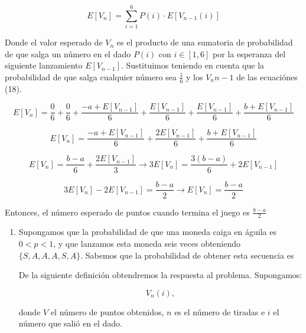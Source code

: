 \documentclass[12pt]{exam}
\begin{document}
\begin{enumerate}
\begin{enumerate}[label=c.]
\begin{equation}
    E[V_n] = \sum_{i=1}^6 P(i)\cdot E[V_{n-1}(i)]
\end{equation}

\justify
Donde el valor esperado de $V_n$ es el producto de una sumatoria de probabilidad de que salga un n\'umero en el dado $P(i)$ con $i\in[1,6]$ por la esperanza del siguiente lanzamiento $E[V_{n-1}]$. Sustituimos teniendo en cuenta que la probabilidad de que salga cualquier n\'umero sea $\frac{1}{6}$ y los $V_n{n-1}$ de las ecuaci\'ones (18).

\begin{equation}
    E[V_n] = \frac{0}{6} + \frac{0}{6} + \frac{- a + E[V_{n-1}]}{6} + \frac{E[V_{n-1}]}{6} + \frac{E[V_{n-1}]}{6} + \frac{b + E[V_{n-1}]}{6}
\end{equation}

\begin{equation}
     E[V_n] = \frac{- a + E[V_{n-1}]}{6} + \frac{2E[V_{n-1}]}{6} + \frac{b + E[V_{n-1}]}{6}
\end{equation}

\begin{equation}
     E[V_n] = \frac{b - a}{6} + \frac{2E[V_{n-1}]}{3} \rightarrow 3E[V_n] = \frac{3(b - a)}{6} + 2E[V_{n-1}]
\end{equation}

\begin{equation}
     3E[V_n] - 2E[V_{n-1}] = \frac{b - a}{2} \rightarrow E[V_n] = \frac{b-a}{2}
\end{equation}

\justify
Entonces, el número esperado de puntos cuando termina el juego es $\frac{b-a}{2}$

\end{enumerate}

\begin{enumerate}[label=d.]
\item Supongamos que la probabilidad de que una moneda caiga en \'aguila es $0 < p < 1$, y que lanzamos esta moneda seis veces obteniendo $\{S,A,A,A,S,A\}$. Sabemos que la probabilidad de obtener esta secuencia es

\justify
De la siguiente definici\'on obtendremos la respuesta al problema. Supongamos:

\begin{equation}
    V_n(i),
\end{equation}

\justify
donde $V$ el número de puntos obtenidos, $n$ es el n\'umero de tiradas e $i$ el n\'umero que sali\'o en el dado.


\end{enumerate}
\end{enumerate}
\end{document}
